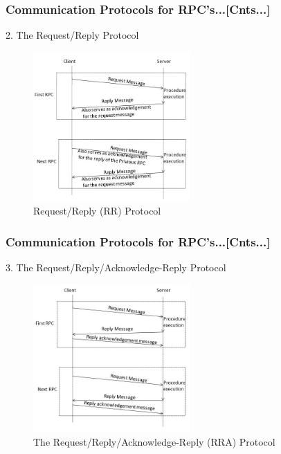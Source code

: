 \documentclass{beamer}
\begin{document}
\begin{frame}
	\frametitle{Communication Protocols for RPC's...[Cnts...]}
	\vspace{0.3cm}
	2. The Request/Reply Protocol
	\begin{figure}
		\centering
		\includegraphics[width=6cm]{fig48.jpg}
		\caption{Request/Reply (RR) Protocol}
	\end{figure}
\end{frame}


\begin{frame}
	\frametitle{Communication Protocols for RPC's...[Cnts...]}
	\vspace{0.3cm}
	3. The Request/Reply/Acknowledge-Reply Protocol
	\begin{figure}
		\centering
		\includegraphics[width=6cm]{fig49.jpg}
		\caption{The Request/Reply/Acknowledge-Reply (RRA) Protocol}
	\end{figure}
\end{frame}
\end{document}
